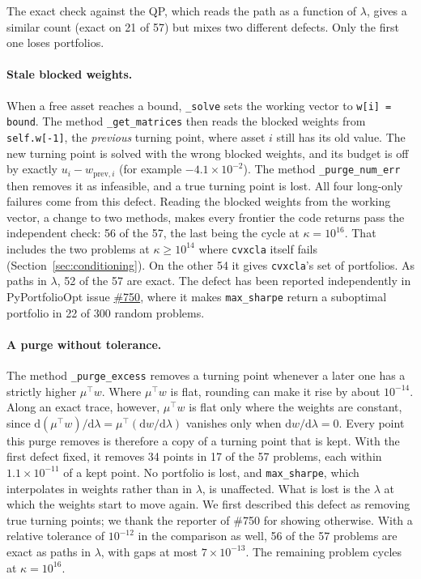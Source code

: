 \documentclass[11pt,a4paper]{article}
\newcommand{\code}[1]{\texttt{#1}}
\newcommand{\cvxcla}{\code{cvxcla}}
\newcommand{\dd}{\mathrm{d}}
\begin{document}
The exact check against the QP, which reads the path as a function of
$\lambda$, gives a similar count (exact on 21 of 57) but mixes two different
defects. Only the first one loses portfolios.

\paragraph{Stale blocked weights.} When a free asset reaches a bound,
\code{\_solve} sets the working vector to \code{w[i] = bound}. The method
\code{\_get\_matrices} then reads the blocked weights from \code{self.w[-1]},
the \emph{previous} turning point, where asset $i$ still has its old value. The
new turning point is solved with the wrong blocked weights, and its budget is
off by exactly $u_i - w_{\text{prev},i}$ (for example $-4.1 \times 10^{-2}$).
The method \code{\_purge\_num\_err} then removes it as infeasible, and a true
turning point is lost. All four long-only failures come from this defect.
Reading the blocked weights from the working vector, a change to two methods,
makes every frontier the code returns pass the independent check: 56 of the
57, the last being the cycle at $\kappa = 10^{16}$. That includes the two
problems at $\kappa \ge 10^{14}$ where \cvxcla{} itself fails
(Section~\ref{sec:conditioning}). On the other 54 it gives \cvxcla{}'s set of
portfolios. As paths in $\lambda$, 52 of the 57 are exact. The defect has been reported independently
in PyPortfolioOpt issue
\href{https://github.com/PyPortfolio/PyPortfolioOpt/issues/750}{\#750}, where
it makes \code{max\_sharpe} return a suboptimal portfolio in 22 of 300 random
problems.

\paragraph{A purge without tolerance.} The method \code{\_purge\_excess}
removes a turning point whenever a later one has a strictly higher
$\mu^\top w$. Where $\mu^\top w$ is flat, rounding can make it rise by about
$10^{-14}$. Along an exact trace, however, $\mu^\top w$ is flat only where the
weights are constant, since
$\dd(\mu^\top w)/\dd\lambda = \mu^\top (\dd w/\dd\lambda)$ vanishes only when
$\dd w/\dd\lambda = 0$. Every point this purge removes is therefore a copy of
a turning point that is kept. With the first defect fixed, it removes 34
points in 17 of the 57 problems, each within $1.1 \times 10^{-11}$ of a kept
point. No portfolio is lost, and \code{max\_sharpe}, which interpolates in
weights rather than in $\lambda$, is unaffected. What is lost is the $\lambda$
at which the weights start to move again. We first described this defect as
removing true turning points; we thank the reporter of \#750 for showing
otherwise. With a relative tolerance of $10^{-12}$ in the comparison as well,
56 of the 57 problems are exact as paths in $\lambda$, with gaps at most
$7 \times 10^{-13}$. The remaining problem cycles at $\kappa = 10^{16}$.
\end{document}
